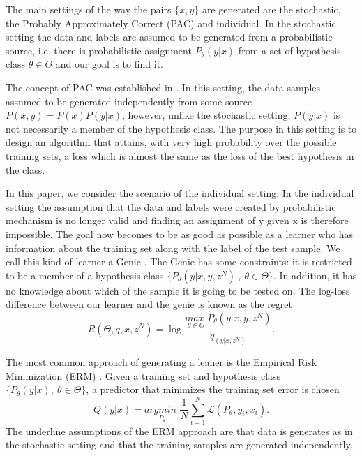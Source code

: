 \documentclass[conference,letterpaper]{IEEEtran}
\begin{document}
The main settings of the way the pairs $\{x,y\}$ are generated are the stochastic, the Probably Approximately Correct (PAC) and individual. 
In the stochastic setting the data and labels are assumed to be generated from a probabilistic source, i.e. there is probabilistic assignment $P_\theta(y|x)$ from a set of hypothesis class $\theta \in \Theta$ and our goal is to find it. 

The concept of PAC was established in  \cite{valiant1984theory}.
In this setting, the data samples assumed to be generated independently from some source $P(x,y)=P(x)P(y|x)$, however, unlike the stochastic setting, $P(y|x)$ is not necessarily a member of the hypothesis class.
The purpose in this setting is to design an algorithm that attains, with very high probability over the possible training sets, a loss which is almost the same as the loss of the best hypothesis in the class. 

In this paper, we consider the scenario of the individual setting. 
In the individual setting the assumption that the data and labels were created by probabilistic mechanism is no longer valid and finding an assignment of y given x is therefore impossible. 
The goal now becomes to be as good as possible as a learner who has information about the training set along with the label of the test sample. 
We call this kind of learner a Genie \cite{feder1992universal}. The Genie has some constraints: it is restricted to be a member of a hypothesis class $\{P_\theta(y|x,y,z^N)\ , \ \theta \in \Theta \}$.  
In addition, it has no knowledge about which of the sample it is going to be tested on. 
The log-loss difference between our learner and the genie is known as the regret
\begin{equation} \label{eq:genie_regret}
R(\Theta, q, x, z^N) = \log \frac{\underset{\theta \in \Theta}{\textit{max }}P_\theta(y|x,y,z^N)}{q_(y|x, z^N)}.
\end{equation}

The most common approach of generating a leaner is the Empirical Risk Minimization (ERM) \cite{vapnik1992principles}. 
Given a training set and hypothesis class $\{P_\theta(y|x),\ \theta \in \Theta\}$, a predictor that minimizes the training set error is chosen
\begin{equation}
Q(y|x) = \underset{P_\theta}{\textit{argmin }} \frac{1}{N}\sum_{i=1}^{N}  \mathcal{L}(P_\theta, y_i, x_i).
\end{equation}
The underline assumptions of the ERM approach are that data is generates as in the stochastic setting and that the training samples are generated independently.
\end{document}
